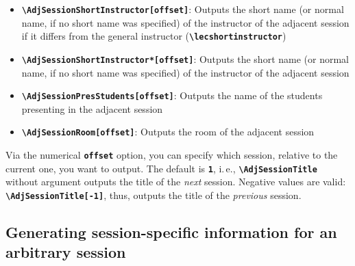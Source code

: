 \documentclass[english]{article}
\newcommand*\jmacro[1]{\textbf{\texttt{#1}}}
\newcommand*\jcsmacro[1]{\jmacro{\textbackslash{#1}}}
\newcommand*\joption[1]{\textbf{\texttt{#1}}}
\newcommand*\jparam[1]{\angus #1\angud}
\begin{document}
\begin{itemize}
	\item \jcsmacro{AdjSessionShortInstructor[\jparam{offset}]}: Outputs the short name (or normal name, if no short name was specified) of the instructor of the adjacent session if it differs from the general instructor (\jcsmacro{lecshortinstructor})
	\item \jcsmacro{AdjSessionShortInstructor*[\jparam{offset}]}: Outputs the short name  (or normal name, if no short name was specified) of the instructor of the adjacent session
	\item \jcsmacro{AdjSessionPresStudents[\jparam{offset}]}: Outputs the name of the students presenting in the adjacent session
	\item \jcsmacro{AdjSessionRoom[\jparam{offset}]}: Outputs the room of the adjacent session
\end{itemize}
Via the numerical \joption{\jparam{offset}} option, you can specify which session, relative to the current one, you want to output. The default is \joption{1}, i.\,e., \jcsmacro{AdjSessionTitle} without argument outputs the title of the \emph{next} session. Negative values are valid: \jcsmacro{AdjSessionTitle[-1]}, thus, outputs the title of the \emph{previous} session.

\subsection{Generating session-specific information for an arbitrary session}\label{sec:arbisess}
\end{document}
